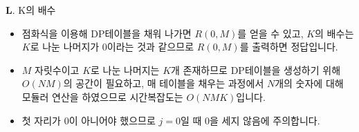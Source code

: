 \begin{frame}{\textbf{L}. K의 배수}
    \begin{itemize}
        \item 점화식을 이용해 DP테이블을 채워 나가면 $R(0,M)$를 얻을 수 있고, $K$의 배수는 $K$로 나눈 나머지가 $0$이라는 것과 같으므로 $R(0,M)$를 출력하면 정답입니다.
        \item $M$ 자릿수이고 $K$로 나눈 나머지는 $K$개 존재하므로 DP테이블을 생성하기 위해  $O(NM)$의 공간이 필요하고, 매 테이블을 채우는 과정에서 $N$개의 숫자에 대해 모듈러 연산을 하였으므로 시간복잡도는 $O(NMK)$입니다.
        \item 첫 자리가 $0$이 아니어야 했으므로 $j = 0$일 때 $0$을 세지 않음에 주의합니다.
    \end{itemize}
\end{frame}
